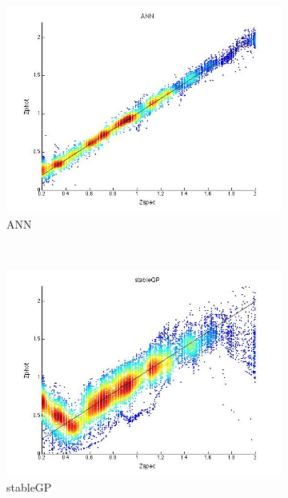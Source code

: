 \documentclass[useAMS,usenatbib,fleqn]{mn2e}
\begin{document}
\begin{figure}
        \centering
        \begin{subfigure}[b]{110px}
                \includegraphics[trim = 35px 15px 50px 25px, clip=true,width=\textwidth]{ANN.jpg}
                \caption{ANN}
        \end{subfigure}
        ~
        \begin{subfigure}[b]{110px}
                \includegraphics[trim = 35px 15px 50px 25px, clip=true,width=\textwidth]{stableGP.jpg}
                \caption{stableGP}
        \end{subfigure}
        ~
        \begin{subfigure}[b]{110px}

\end{subfigure}
\end{figure}
\end{document}
